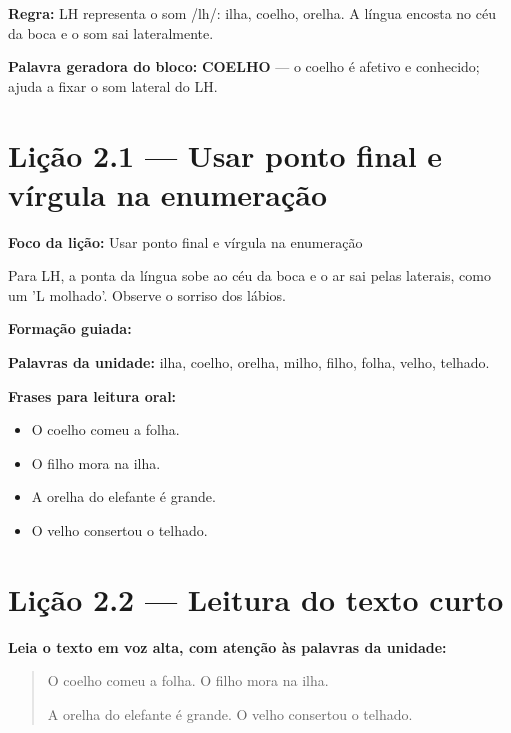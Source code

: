 \textbf{Regra:} LH representa o som /lh/: ilha, coelho, orelha. A língua encosta no céu da boca e o som sai lateralmente.

\textbf{Palavra geradora do bloco:} \textbf{COELHO} --- o coelho é afetivo e conhecido; ajuda a fixar o som lateral do LH.

\section{Lição 2.1 --- Usar ponto final e vírgula na enumeração}

\textbf{Foco da lição:} Usar ponto final e vírgula na enumeração


\begin{boquinha}
Para LH, a ponta da língua sobe ao céu da boca e o ar sai pelas laterais, como um 'L molhado'. Observe o sorriso dos lábios.
\end{boquinha}

\noindent\textbf{Formação guiada:}

\begin{center}
\end{center}

\noindent\textbf{Palavras da unidade:} ilha, coelho, orelha, milho, filho, folha, velho, telhado.

\noindent\textbf{Frases para leitura oral:}
\begin{itemize}[leftmargin=1.6em]
  \item O coelho comeu a folha.
  \item O filho mora na ilha.
  \item A orelha do elefante é grande.
  \item O velho consertou o telhado.
\end{itemize}

\section{Lição 2.2 --- Leitura do texto curto}

\noindent\textbf{Leia o texto em voz alta, com atenção às palavras da unidade:}


\begin{quote}
O coelho comeu a folha. O filho mora na ilha.

A orelha do elefante é grande. O velho consertou o telhado.
\end{quote}

